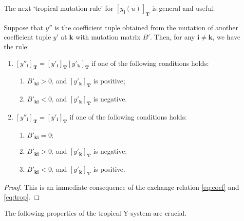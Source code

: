 The next `tropical mutation rule' for $[y_{\mathbf{i}}(u)]_{\mathbf{T}}$
is general and  useful.
\begin{Lemma}
\label{lem:mutation}
Suppose that $y''$ is the coefficient tuple obtained from
the mutation of another coefficient tuple $y'$ at $\mathbf{k}$
with mutation matrix $B'$. Then, for any $\mathbf{i}\neq \mathbf{k}$,
we have the rule:
\begin{enumerate}\itemsep=0pt
\item[$(i)$] $[y''_{\mathbf{i}}]_{\mathbf{T}} =
 [y'_{\mathbf{i}}]_{\mathbf{T}}[y'_{\mathbf{k}}]_{\mathbf{T}}$
 if one of the following conditions holds:
\begin{enumerate}\itemsep=0pt
\item[$(a)$] $B'_{\mathbf{k}\mathbf{i}}> 0$,
 and $[y'_{\mathbf{k}}]_{\mathbf{T}}$ is
positive;
\item[$(b)$]  $B'_{\mathbf{k}\mathbf{i}}< 0$,
 and $[y'_{\mathbf{k}}]_{\mathbf{T}}$ is
negative.
\end{enumerate}
\item[$(ii)$]
$[y''_{\mathbf{i}}]_{\mathbf{T}} =
 [y'_{\mathbf{i}}]_{\mathbf{T}}$
 if one of the following conditions holds:
\begin{enumerate}\itemsep=0pt
\item[$(a)$] $B'_{\mathbf{k}\mathbf{i}}=0$;

\item[$(b)$]
 $B'_{\mathbf{k}\mathbf{i}}> 0$,
 and $[y'_{\mathbf{k}}]_{\mathbf{T}}$ is
 negative;
\item[$(c)$] $B'_{\mathbf{k}\mathbf{i}}< 0$,
 and $[y'_{\mathbf{k}}]_{\mathbf{T}}$ is
 positive.
 \end{enumerate}
 \end{enumerate}
\end{Lemma}
\begin{proof}
This is an immediate consequence of the exchange relation
\eqref{eq:coef} and \eqref{eq:trop}.
\end{proof}


The following properties
of the tropical Y-system are crucial.

